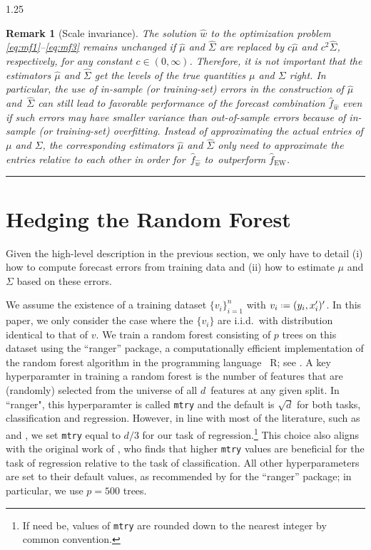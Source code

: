 \documentclass[12pt]{article}
\newcommand*{\defeq}{\mathrel{\vcenter{\baselineskip0.5ex\lineskiplimit0pt\hbox{\scriptsize.}\hbox{\scriptsize.}}}=}
\newtheorem{remark}{Remark}[section]
\numberwithin{equation}{section}
\theoremstyle{plain}
\def\qed{\rule{2mm}{2mm}}
\begin{document}
\begin{spacing}{1.25}
\begin{remark}[Scale invariance]\label{rem:scale}
  \rm
The solution $\hat w$ to the optimization problem
\eqref{eq:mf1}--\eqref{eq:mf3} remains unchanged if $\hat \mu$ and
$\hat \Sigma$ are replaced by $c \hat \mu$ and $c^2 \hat \Sigma$,
respectively, for any constant $ c \in (0, \infty)$. Therefore, it is
not important that the estimators $\hat \mu$ and $\hat \Sigma$ get the levels of the true quantities $\mu$ and $\Sigma$ right.
In
particular, the use of in-sample (or training-set) errors in the
construction of $\hat \mu$ and~$\hat \Sigma$ can still lead to
favorable performance of the forecast combination $\hat f_{\hat w}$
even if such errors may have smaller variance than
out-of-sample errors because of in-sample (or training-set)
overfitting. Instead of approximating the actual entries of $\mu$ and
$\Sigma$, the corresponding estimators $\hat \mu$ and $\hat \Sigma$ only
need to approximate the entries relative to each other in order 
for~$\hat f_{\hat w}$ to~outperform $\hat f_{\text{EW}}$.~\qed
\end{remark}


\section{Hedging the Random Forest}
\label{sec:hrf}

Given the high-level description in the previous section, we only have
to detail (i) how to compute forecast errors from training data
and (ii) how to
estimate $\mu$ and $\Sigma$ based on these errors.

We assume the existence of a training dataset $\{v_i\}_{i=1}^n$ with $v_i \defeq (y_i, x_i')'$. In this paper, we only consider the case where the $\{v_i\}$ are i.i.d.\ with distribution identical to that of $v$.
We train a random forest consisting of $p$ trees on this dataset
using the ``ranger'' package, a computationally efficient implementation of the random forest algorithm in the
programming language ~{\sc R}; see \cite{ranger:2017}. 
A key hyperparamter in training a random forest is the number of features that are (randomly) selected from the universe of all $d$~features at any given split. In ``ranger", this hyperparamter is called \texttt{mtry} and the default is $\sqrt{d}$ for both tasks, classification and regression. However, in line with most of the literature, such as \cite{random:forest:2002} and
\citet[Chapter~15]{hastie:tibshirani:freedman:2017}, we set \texttt{mtry} equal to $d/3$ for our task of regression.\footnote{If need be, values of \texttt{mtry} are rounded down to the nearest integer by common convention.}
This choice also aligns with the original work of \citep{breiman:2001}, who finds that higher \texttt{mtry} values are beneficial for the task of regression relative to the task of classification.
All other hyperparameters are set to their default values, as recommended by \citet{ranger:2017} for the ``ranger'' package; in particular, we use $p=500$ trees.


\end{spacing}
\end{document}
